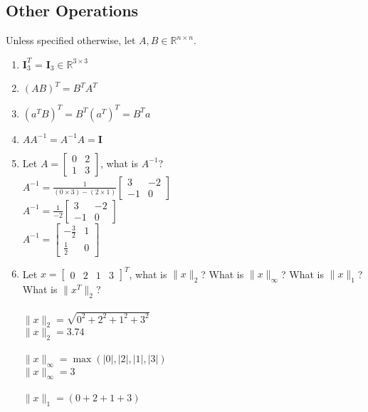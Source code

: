 \documentclass{assignment}
\newcommand{\R}{\mathbb{R}}
\begin{document}
\begin{problem}
\begin{enumerate}
\end{enumerate}

\subsection{Other Operations}
\noindent Unless specified otherwise, let $A, B \in \R^{n\times n}$.
\begin{enumerate}
    \item $\mathbf{I}_3^T$ = $\mathbf{I}_3 \in \R^{3\times 3}$
    \item $(AB)^T = B^TA^T$
    \item $(a^TB)^T = B^T(a^T)^T = B^Ta$
    \item $AA^{-1} = A^{-1}A = \mathbf{I}$
    \item Let $A =\begin{bmatrix} 0 & 2 \\ 1 & 3 \end{bmatrix}$, what is $A^{-1}$?\\
    $A^{-1} = \frac{1}{(0 \times 3) - (2 \times 1)} \begin{bmatrix} 3 & -2 \\ -1 & 0 \end{bmatrix}$\\
    $A^{-1} = \frac{1}{-2} \begin{bmatrix} 3 & -2 \\ -1 & 0 \end{bmatrix}$\\
    $A^{-1} = \begin{bmatrix} -\frac{3}{2} & 1 \\ \frac{1}{2} & 0 \end{bmatrix}$
    \item Let $x = \begin{bmatrix} 0 & 2 & 1 & 3 \end{bmatrix}^T$, what is $\lVert x \rVert_2$? What is $\lVert x \rVert_{\infty}$? What is $\lVert x \rVert_1$? What is $\lVert x^T \rVert_2$?\\\\
    $\lVert x \rVert_2 = \sqrt{0^2 + 2^2 + 1^2 + 3^2}$\\
    $\lVert x \rVert_2 = 3.74$\\\\
    $\lVert x \rVert_{\infty} = \max(|0|, |2|, |1|, |3|)$\\
    $\lVert x \rVert_{\infty} = 3$\\\\    
    $\lVert x \rVert_{1} = (0 + 2 + 1 + 3)$\\

\end{enumerate}
\end{problem}
\end{document}

